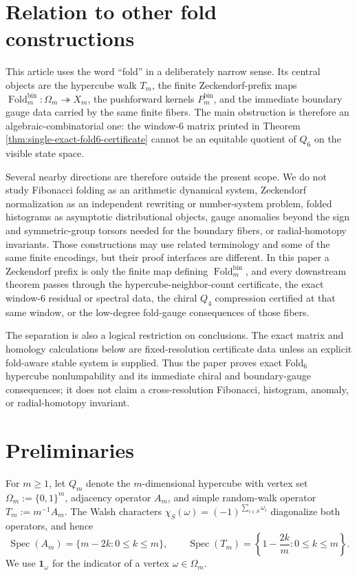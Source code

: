 \documentclass[12pt,a4paper]{article}
\theoremstyle{plain}
\theoremstyle{definition}
\numberwithin{equation}{section}
\DeclareMathOperator{\Spec}{Spec}
\newcommand{\Fold}{\operatorname{Fold}}
\begin{document}
\section{Relation to other fold constructions}\label{sec:relation-other-constructions}
This article uses the word ``fold'' in a deliberately narrow sense.  Its central objects are the hypercube walk \(T_m\), the finite Zeckendorf-prefix maps \(\Fold_m^{\mathrm{bin}}:\Omega_m\twoheadrightarrow X_m\), the pushforward kernels \(P_m^{\mathrm{bin}}\), and the immediate boundary gauge data carried by the same finite fibers.  The main obstruction is therefore an algebraic-combinatorial one: the window-\(6\) matrix printed in Theorem \ref{thm:single-exact-fold6-certificate} cannot be an equitable quotient of \(Q_6\) on the visible state space.

Several nearby directions are therefore outside the present scope.  We do not study Fibonacci folding as an arithmetic dynamical system, Zeckendorf normalization as an independent rewriting or number-system problem, folded histograms as asymptotic distributional objects, gauge anomalies beyond the sign and symmetric-group torsors needed for the boundary fibers, or radial-homotopy invariants.  Those constructions may use related terminology and some of the same finite encodings, but their proof interfaces are different.  In this paper a Zeckendorf prefix is only the finite map defining \(\Fold_m^{\mathrm{bin}}\), and every downstream theorem passes through the hypercube-neighbor-count certificate, the exact window-\(6\) residual or spectral data, the chiral \(Q_4\) compression certified at that same window, or the low-degree fold-gauge consequences of those fibers.

The separation is also a logical restriction on conclusions.  The exact matrix and homology calculations below are fixed-resolution certificate data unless an explicit fold-aware stable system is supplied.  Thus the paper proves exact Fold\(_6\) hypercube nonlumpability and its immediate chiral and boundary-gauge consequences; it does not claim a cross-resolution Fibonacci, histogram, anomaly, or radial-homotopy invariant.

\section{Preliminaries}\label{sec:preliminaries}
For \(m\ge 1\), let \(Q_m\) denote the \(m\)-dimensional hypercube with vertex set \(\Omega_m:=\{0,1\}^m\), adjacency operator \(A_m\), and simple random-walk operator \(T_m:=m^{-1}A_m\). The Walsh characters \(\chi_S(\omega)=(-1)^{\sum_{i\in S}\omega_i}\) diagonalize both operators, and hence
\[
\Spec(A_m)=\{m-2k:0\le k\le m\},
\qquad
\Spec(T_m)=\left\{1-\frac{2k}{m}:0\le k\le m\right\}.
\]
We use \(\mathbf 1_\omega\) for the indicator of a vertex \(\omega\in\Omega_m\).
\end{document}
